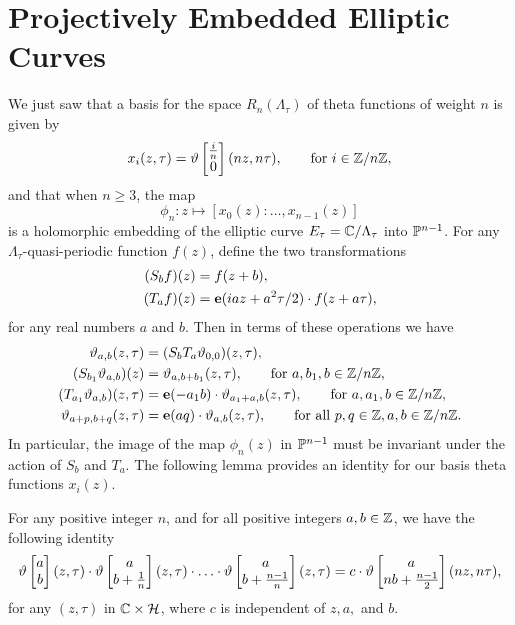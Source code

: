 \section{Projectively Embedded Elliptic Curves}
\label{embeddings}

We just saw that a basis for the space $R_{n}(\Lambda_{\tau})$ of theta functions of weight $n$ is given by
\begin{equation}
	x_{i}(z,\tau) = \vartheta\begin{bmatrix} \tfrac{i}{n}\\ 0 \end{bmatrix}(nz,n\tau),\qquad \text{for }i\in \mathbb{Z}/n\mathbb{Z},
\end{equation}
and that when $n \geq 3$, the map
\begin{equation*}
	\phi_{n}: z \longmapsto [x_{0}(z): \ldots, x_{n-1}(z)]
\end{equation*}
is a holomorphic embedding of the elliptic curve $E_{\tau} = \mathbb{C}/\Lambda_{\tau}$ into $\mathbb{P}^{n-1}$. For any $\Lambda_{\tau}$-quasi-periodic function $f(z)$, define the two transformations
\begin{equation}
	\begin{split}
	(S_{b} f)(z) &= f(z + b),\\
	(T_{a}f)(z) &= \mathbf{e}(iaz + a^{2}\tau/2)\cdot f(z+a\tau),
	\end{split}
\end{equation}
for any real numbers $a$ and $b$. Then in terms of these operations we have
\begin{equation}
	\begin{split}
	\vartheta_{a,b}(z,\tau) &= (S_{b}T_{a}\vartheta_{0,0})(z,\tau),\\
	(S_{b_{1}}\vartheta_{a,b})(z) &= \vartheta_{a,b + b_{1}}(z,\tau),\qquad \text{for } a,b_{1}, b \in \mathbb{Z}/n\mathbb{Z}, \\
	(T_{a_{1}}\vartheta_{a,b})(z,\tau) &= \mathbf{e}(-a_{1}b)\cdot\vartheta_{a_{1} + a,b}(z,\tau),\qquad \text{for } a,a_{1}, b \in \mathbb{Z}/n\mathbb{Z}, \\
	\vartheta_{a+p, b + q}(z,\tau) &= \mathbf{e}(aq)\cdot \vartheta_{a,b}(z,\tau) ,\qquad \text{for all } p, q \in \mathbb{Z}, a, b \in \mathbb{Z}/n\mathbb{Z}.
	\end{split}
\end{equation}
In particular, the image of the map $\phi_{n}(z)$ in $\mathbb{P}^{n-1}$ must be invariant under the action of $S_{b}$ and $T_{a}$. The following lemma provides an identity for our basis theta functions $x_{i}(z)$.\\

\begin{lemma}
	\label{product_lemma}
	For any positive integer $n$, and for all positive integers $a, b \in\mathbb{Z}$, we have the following identity
	\begin{equation}
		\label{product_identity}
		\vartheta\begin{bmatrix} a\\ b \end{bmatrix}(z,\tau)\cdot\vartheta\begin{bmatrix} a\\ b + \frac{1}{n} \end{bmatrix}(z,\tau)\cdot\ldots\cdot\vartheta\begin{bmatrix} a\\ b+\frac{n-1}{n} \end{bmatrix}(z,\tau) = c\cdot\vartheta\begin{bmatrix} a\\ nb + \frac{n-1}{2} \end{bmatrix}(nz,n\tau),
	\end{equation}
	for any $(z,\tau)$ in $\mathbb{C} \times \mathcal{H}$, where $c$ is independent of $z, a,$ and $b$.
\end{lemma}

